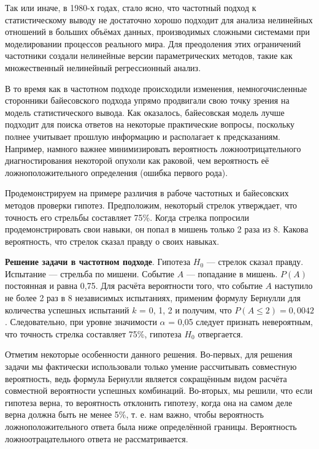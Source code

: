 Так или иначе, в 1980-х годах, стало ясно, что частотный подход к статистическому выводу не достаточно хорошо подходит для анализа нелинейных отношений в больших объёмах данных, производимых сложными системами при моделировании процессов реального мира\cite[стр. 10]{handbook_stat_dm}. Для преодоления этих ограничений частотники создали нелинейные версии параметрических методов, такие как множественный нелинейный регрессионный анализ.

В то время как в частотном подходе происходили изменения, немногочисленные сторонники байесовского подхода упрямо продвигали свою точку зрения на модель статистического вывода. Как оказалось, байесовская модель лучше подходит для поиска ответов на некоторые практические вопросы, поскольку полнее учитывает прошлую информацию и располагает к предсказаниям. Например, намного важнее минимизировать вероятность ложноотрицательного диагностирования некоторой опухоли как раковой, чем вероятность её ложноположительного определения (ошибка первого рода). 


Продемонстрируем на примере различия в рабоче частотных и байесовских методов проверки гипотез. Предположим, некоторый стрелок утверждает, что точность его стрельбы составляет 75\%. Когда стрелка попросили продемонстрировать свои навыки, он попал в мишень только 2 раза из 8. Какова вероятность, что стрелок сказал правду о своих навыках.

\textbf{Решение задачи в частотном подходе}. Гипотеза $H_{0}$ --- стрелок сказал правду. Испытание --- стрельба по мишени. Событие $A$ --- попадание в мишень. $P(A)$ постоянная и равна 0,75. Для расчёта вероятности того, что событие $A$ наступило не более 2 раз в 8 независимых испытаниях, применим формулу Бернулли для количества успешных испытаний $k$ = 0, 1, 2 и получим, что $P(A\leq 2)=0,0042$. Следовательно, при уровне значимости $\alpha$ = 0,05 следует признать невероятным, что точность стрелка составляет 75\%, гипотеза $H_{0}$ отвергается. 

Отметим некоторые особенности данного решения. Во-первых, для решения задачи мы фактически использовали только умение рассчитывать совместную вероятность, ведь формула Бернулли является сокращённым видом расчёта совместной вероятности успешных комбинаций. Во-вторых, мы решили, что если гипотеза верна, то  вероятность отклонить гипотезу, когда она на самом деле верна должна быть не менее 5\%, т. е. нам важно, чтобы вероятность ложноположительного ответа была ниже определённой границы. Вероятность ложноотрацательного ответа не рассматривается.

